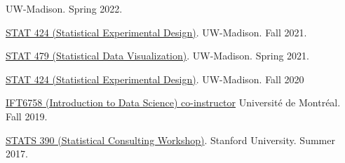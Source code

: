 \documentclass[letterpaper]{article}
\renewenvironment{itemize}{
  \begin{list}{}{
    \setlength{\leftmargin}{1.5em}
  }
}{
  \end{list}
}
\begin{document}
\begin{itemize}
UW-Madison. Spring 2022.
\item \href{https://krisrs1128.github.io/stat424_f21}{STAT 424 (Statistical Experimental Design)}.
UW-Madison. Fall 2021.
\item \href{https://krisrs1128/github.io/stat479/}{STAT 479 (Statistical Data Visualization)}.
UW-Madison. Spring 2021.
\item \href{https://mediaspace.wisc.edu/channel/STAT424Fall2020/180027062}{STAT
424 (Statistical Experimental Design)}. UW-Madison. Fall
2020
\item \href{https://ift6758.github.io/}{IFT6758 (Introduction to Data Science) co-instructor}
Universit\'e de Montr\'eal. Fall 2019.
\item \href{https://www.overleaf.com/10240923zrkwyvndkwnn#/37916755/}{STATS 390 (Statistical Consulting Workshop)}.
  Stanford University. Summer 2017.
\end{itemize}
\end{document}
